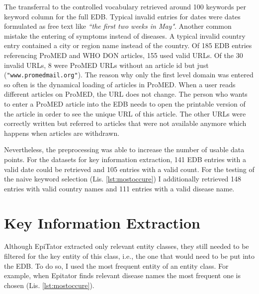   The transferral to the controlled vocabulary retrieved around 100 keywords per keyword column for the full EDB.
  Typical invalid entries for dates were dates formulated as free text like \textit{``the first two weeks in May"}.
  Another common mistake the entering of symptoms instead of diseases.
  A typical invalid country entry contained a city or region name instead of the country.
  Of 185 EDB entries referencing ProMED and WHO DON articles, 155 used valid URLs. Of the 30 invalid URLs, 8 were ProMED URLs without an article id but just (\texttt{"www.promedmail.org"}).
  The reason why only the first level domain was entered so often is the dynamical loading of articles in ProMED.
  When a user reads different articles on ProMED, the URL does not change.
  The person who wants to enter a ProMED article into the EDB needs to open the printable version of the article in order to see the unique URL of this article.
  The other URLs were correctly written but referred to articles that were not available anymore which happens when articles are withdrawn.

  Nevertheless, the preprocessing was able to increase the number of usable data points.
  For the datasets for key information extraction, 141 EDB entries with a valid date could be retrieved and 105 entries with a valid count.
  For the testing of the naive keyword selection (Lis. \ref{lst:mostoccure}) I additionally retrieved 148 entries with valid country names and 111 entries with a valid disease name.


\section{Key Information Extraction}
  Although EpiTator extracted only relevant entity classes, they still needed to be filtered for the key entity of this class, i.e., the one that would need to be put into the EDB.
  To do so, I used the most frequent entity of an entity class.
  For example, when Epitator finds relevant disease names the most frequent one is chosen (Lis. \ref{lst:mostoccure}).

